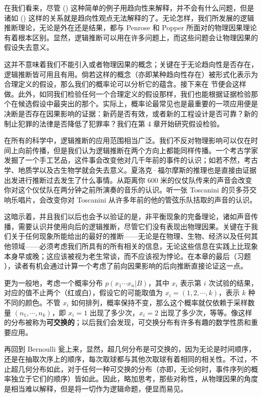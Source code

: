 在我们看来，尽管 (\in[3-38]) 这种简单的例子用趋向性来解释，并不会有什么问题，但是诸如 (\in[3-40]) 这样的关系就是趋向性观点无法解释的了。无论怎样，我们所发展的逻辑推断理论，无论是外在还是结果，都与 Penrose 和 Popper 所面对的物理因果理论有着根本区别。显然，逻辑推断可以用在许多问题上，而这些问题会让物理因果的假设失去意义。

这并不意味着我们不能引入或者物理因果的概念；关键在于无论趋向性是否存在，逻辑推断皆可用且有用。倘若这样的概念（亦即某种趋向性存在）被形式化表示为合理定义的假设，那么我们的概率论可以分析它的蕴含。接下来在 \in[sec-3-10] 节便会这样做。此外，如同我们检验任何一个合理定义的假设那样，我们也能根据证据检验那个在候选假设中最突出的那个。实际上，概率论最常见也是最重要的一项应用便是决断是否存在因果影响的证据：新药是否有效，或者新的工程设计是否可靠？新的制止犯罪的法律是否降低了犯罪率？我们在第 4 章开始研究假设检验。

在所有的科学中，逻辑推断的应用范围相当广泛。我们不反对物理影响可以仅在时间上向前传播，但是我们认为逻辑推断在两个方向上都能同样传播。一个考古学家发掘了一个手工艺品，这件事会改变他对几千年前的事件的认识；如若不然，考古学、地质学以及古生物学就会失去意义。夏洛克·福尔摩斯的推理也是直接由证据出发进行推断过去发生了什么事情。从距离你 600 米的仪仗队传来的声音会改变你对这个仪仗队在两分钟之前所演奏的音乐的认识。听一张 Toscanini 的贝多芬交响乐唱片，会改变你对 Toscanini 从许多年前的他的管弦乐队拮取的声音的认识。

这暗示着，并且我们以后也会予以验证的是，非平衡现象的完备理论，诸如声音传播，需要认识并使用向后的逻辑推断，尽管它们没有表现出物理因果。关键在于我们关于任何现象所能给出的最好的推断——无论是在物理、生物、经济以及任何其他领域——必须考虑我们所具有的所有相关的信息，无论这些信息在实践上比现象本身早或晚；这应该被视为老生常谈，而不应该视为悖论。在本章的最后（习题 \in[ex-3-6]），读者有机会通过计算一个考虑了前向因果影响的后向推断直接论证这一点。

更为一般地，考虑一个概率分布 $p(x_1\cdots x_n|B)$，其中 $x_i$ 表示第 $i$ 次试验的结果，对应的值不止两个（红或白），假设它的可能取值为 $x_i = (1,2,\cdots, k)$，表示 $k$ 种不同的颜色。不管 $x_i$ 如何排列，概率保持不变，那么这个概率就仅依赖于采样数量 $(n_1,\cdots,n_k)$，即 $x_i = 1$ 出现了多少次，$x_i = 2$ 出现了多少次，等等。像这样的分布被称为{\bf 可交换的}；以后我们会发现，可交换分布有许多有趣的数学性质和重要应用。

再回到 Bernoulli 瓮上来，显然，超几何分布是可交换的，因为无论是时间顺序，还是在抽取次序上的顺序，每次取球都与其他次取球有着相同的相关性。不过，不止超几何分布如此，对于任何一种可交换的分布（亦即，无论何时，事件序列的概率独立于它们的顺序）皆如此。因此，略加思考，那些对称性，从物理因果的角度是相当难以解释，但是将一切作为逻辑命题，便显而易见。

